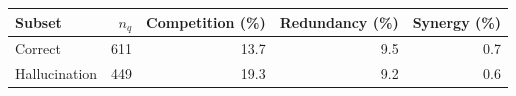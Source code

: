 \begin{tabular}{lrrrr}
\toprule
Subset & $n_q$ & Competition (\%) & Redundancy (\%) & Synergy (\%) \\
\midrule
Correct & 611 & 13.7 & 9.5 & 0.7 \\
Hallucination & 449 & 19.3 & 9.2 & 0.6 \\
\bottomrule
\end{tabular}
